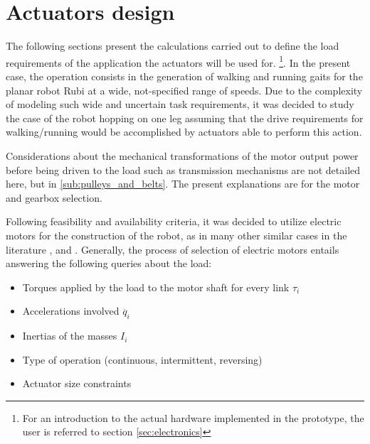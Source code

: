 
\section{Actuators design}
\label{sec_actuators}
The following sections present the calculations carried out to define the load requirements of the application the actuators will be used for.
\footnote{For an introduction to the actual hardware implemented in the prototype, the user is referred to section \ref{sec:electronics}}.
In the present case, the operation consists in the generation of walking and running gaits for the planar robot Rubi at a wide, not-specified range of speeds. 
Due to the complexity of modeling such wide and uncertain task requirements, it was decided to study the case of the robot hopping on one leg assuming that the drive requirements for walking/running would be accomplished by actuators able to perform this action.

Considerations about the mechanical transformations of the motor output power before being driven to the load such as transmission mechanisms are not detailed here, but in \ref{sub:pulleys_and_belts}.
The present explanations are for the motor and gearbox selection.

Following feasibility and availability criteria, it was decided to utilize electric motors for the construction of the robot, as in many other similar cases in the literature \cite{runbot1}, \cite{phides} and \cite{biobiped}.
Generally, the process of selection of electric motors entails answering the following queries about the load:

\begin{itemize}
\label{list:motor_selection}
	\item Torques applied by the load to the motor shaft for every link $\tau_{i}$
	\item Accelerations involved $\ddot{q_{i}}$
	\item Inertias of the masses $I_{i}$
	\item Type of operation (continuous, intermittent, reversing)
	\item Actuator size constraints
\end{itemize}

